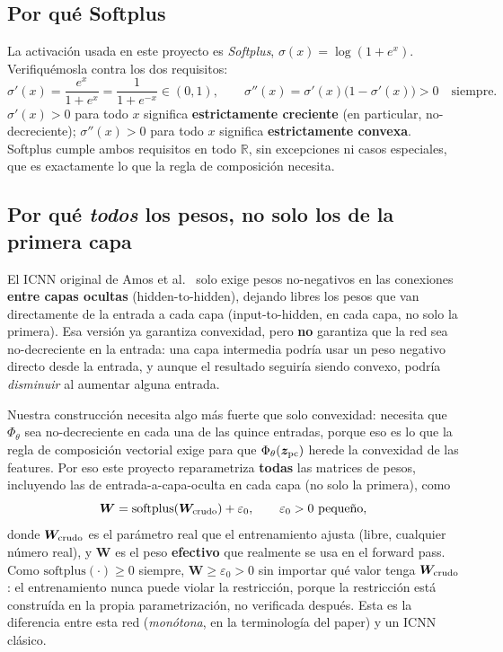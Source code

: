\documentclass[11pt,a4paper]{article}
\newcommand{\R}{\mathbb{R}}
\begin{document}
\subsection{Por qu\'e Softplus}

La activaci\'on usada en este proyecto es \emph{Softplus},
$\sigma(x)=\log(1+e^x)$. Verifiqu\'emosla contra los dos requisitos:
\[
 \sigma'(x)=\frac{e^x}{1+e^x}=\frac1{1+e^{-x}}\in(0,1),
 \qquad
 \sigma''(x)=\sigma'(x)\big(1-\sigma'(x)\big)>0 \quad\text{siempre.}
\]
$\sigma'(x)>0$ para todo $x$ significa \textbf{estrictamente
creciente} (en particular, no-decreciente); $\sigma''(x)>0$ para todo
$x$ significa \textbf{estrictamente convexa}. Softplus cumple ambos
requisitos en todo $\R$, sin excepciones ni casos especiales, que es
exactamente lo que la regla de composici\'on necesita.

\subsection{Por qu\'e \emph{todos} los pesos, no solo los de la primera capa}

El ICNN original de Amos et al.~\cite{Amos2017} solo exige pesos
no-negativos en las conexiones \textbf{entre capas ocultas}
(hidden-to-hidden), dejando libres los pesos que van directamente de la
entrada a cada capa (input-to-hidden, en cada capa, no solo la primera).
Esa versi\'on ya garantiza convexidad, pero \textbf{no} garantiza que la
red sea no-decreciente en la entrada: una capa intermedia podr\'ia usar
un peso negativo directo desde la entrada, y aunque el resultado seguir\'ia
siendo convexo, podr\'ia \emph{disminuir} al aumentar alguna entrada.

Nuestra construcci\'on necesita algo m\'as fuerte que solo convexidad:
necesita que $\Phi_\theta$ sea no-decreciente en cada una de las quince
entradas, porque eso es lo que la regla de composici\'on vectorial exige
para que $\Phi_\theta(\bm z_{\rm pc})$ herede la convexidad de las
features. Por eso este proyecto reparametriza \textbf{todas} las
matrices de pesos, incluyendo las de entrada-a-capa-oculta en cada capa
(no solo la primera), como
\[
 \bm W=\mathrm{softplus}(\bm W_{\rm crudo})+\varepsilon_0,\qquad
 \varepsilon_0>0\text{ peque\~no},
\]
donde $\bm W_{\rm crudo}$ es el par\'ametro real que el entrenamiento
ajusta (libre, cualquier n\'umero real), y $\bm W$ es el peso
\textbf{efectivo} que realmente se usa en el forward pass. Como
$\mathrm{softplus}(\cdot)\geq0$ siempre, $\bm W\geq\varepsilon_0>0$ sin
importar qu\'e valor tenga $\bm W_{\rm crudo}$: el entrenamiento nunca
puede violar la restricci\'on, porque la restricci\'on est\'a
constru\'ida en la propia parametrizaci\'on, no verificada despu\'es.
Esta es la diferencia entre esta red (\emph{mon\'otona}, en la
terminolog\'ia del paper) y un ICNN cl\'asico.
\end{document}
